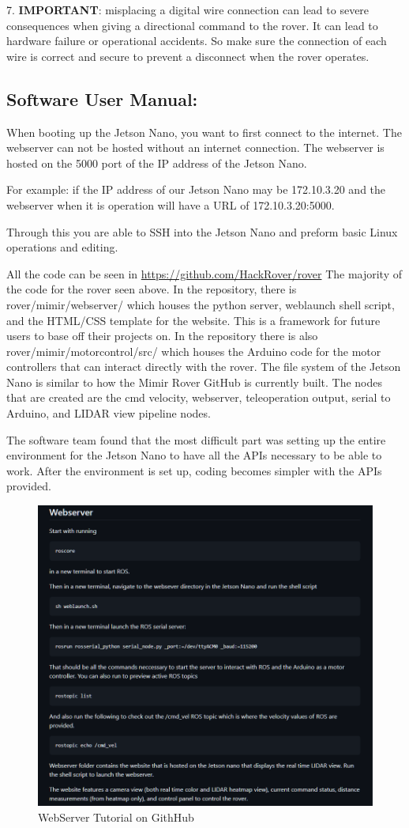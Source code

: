 \documentclass[a4paper, 10pt]{article}
\begin{document}
7. \textbf{IMPORTANT}: misplacing a digital wire connection can lead to severe consequences when giving a directional command to the rover. It can lead to hardware failure or operational accidents. So make sure the connection of each wire is correct and secure to prevent a disconnect when the rover operates.

\subsection{Software User Manual:}
    When booting up the Jetson Nano, you want to first connect to the internet. The webserver can not be hosted without an internet connection. The webserver is hosted on the 5000 port of the IP address of the Jetson Nano. 
    
    For example: if the IP address of our Jetson Nano may be 172.10.3.20 and the webserver when it is operation will have a URL of 172.10.3.20:5000.

    Through this you are able to SSH into the Jetson Nano and preform basic Linux operations and editing.
    
    All the code can be seen in \url{https://github.com/HackRover/rover}
    The majority of the code for the rover seen above. In the repository, there is rover/mimir/webserver/ which houses the python server, weblaunch shell script, and the HTML/CSS template for the website. This is a framework for future users to base off their projects on.
    In the repository there is also rover/mimir/motorcontrol/src/ which houses the Arduino code for the motor controllers that can interact directly with the rover.
    The file system of the Jetson Nano is similar to how the Mimir Rover GitHub is currently built. 
    The nodes that are created are the cmd velocity, webserver, teleoperation output, serial to Arduino, and LIDAR view pipeline nodes.

    The software team found that the most difficult part was setting up the entire environment for the Jetson Nano to have all the APIs necessary to be able to work. After the environment is set up, coding becomes simpler with the APIs provided. 

	\begin{figure} [!h]
			\centering
			\includegraphics[scale=0.5]{Photos/WebserverTut.png}
			\caption{WebServer Tutorial on GithHub}
			\label{webserver}
	\end{figure}
\end{document}
